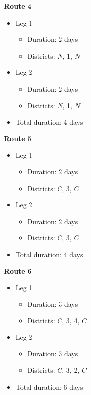 \documentclass[10pt]{article}
\begin{document}
\newpage 
\begin{minipage}[t]{0.3\textwidth}
    \textbf{Route 4}
    \begin{itemize}
        \item Leg 1
        \begin{itemize}
            \item Duration: 2 days 
            \item Districts: $N $, 1, $N $
        \end{itemize}
        \item Leg 2
        \begin{itemize}
            \item Duration: 2 days 
            \item Districts: $N $, 1, $N $
        \end{itemize}
        \item Total duration: 4 days
    \end{itemize}
\end{minipage}
\hfill
\begin{minipage}[t]{0.3\textwidth}
    \textbf{Route 5}
    \begin{itemize}
        \item Leg 1
        \begin{itemize}
            \item Duration: 2 days 
            \item Districts: $C $, 3, $C $
        \end{itemize}
        \item Leg 2
        \begin{itemize}
            \item Duration: 2 days 
            \item Districts: $C $, 3, $C $
        \end{itemize}
        \item Total duration: 4 days
    \end{itemize}
\end{minipage}
\hfill
\begin{minipage}[t]{0.3\textwidth}
    \textbf{Route 6}
    \begin{itemize}
        \item Leg 1
        \begin{itemize}
            \item Duration: 3 days 
            \item Districts: $C $, 3, 4, $C $
        \end{itemize}
        \item Leg 2
        \begin{itemize}
            \item Duration: 3 days 
            \item Districts: $C $, 3, 2, $C $
        \end{itemize}
        \item Total duration: 6 days
    \end{itemize}
\end{minipage}
\end{document}

